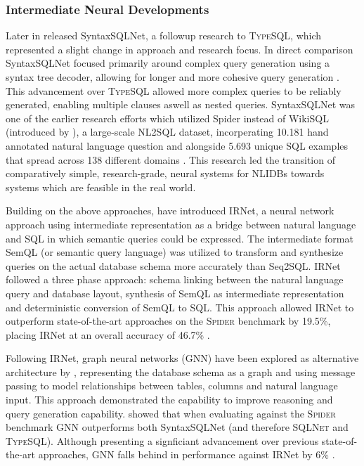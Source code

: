 \subsubsection{Intermediate Neural Developments}

Later in \citeyear{SyntaxSQLNet} \citeauthor*{SyntaxSQLNet} released SyntaxSQLNet, a followup research to \textsc{TypeSQL},
which represented a slight change in approach and research focus. In direct comparison SyntaxSQLNet focused primarily around
complex query generation using a syntax tree decoder, allowing for longer and more cohesive query generation \citep{SyntaxSQLNet}.
This advancement over \textsc{TypeSQL} allowed more complex queries to be reliably generated, enabling multiple clauses aswell as
nested queries. SyntaxSQLNet was one of the earlier research efforts which utilized Spider instead of WikiSQL (introduced by 
\cite{Seq2SQL}), a large-scale NL2SQL dataset, incorperating 10.181 hand annotated natural language question and alongside
5.693 unique SQL examples that spread across 138 different domains \citep{Spider}. This research led the transition of
comparatively simple, research-grade, neural systems for NLIDBs towards systems which are feasible in the real world.

Building on the above approaches, \citeauthor*{IRNet} have introduced IRNet, a neural network approach using intermediate
representation as a bridge between natural language and SQL in which semantic queries could be expressed. The intermediate
format SemQL (or semantic query language) was utilized to transform and synthesize queries on the actual database schema more
accurately than Seq2SQL. IRNet followed a three phase approach: schema linking between the natural language query and database
layout, synthesis of SemQL as intermediate representation and deterministic conversion of SemQL to SQL. This approach allowed
IRNet to outperform state-of-the-art approaches on the \textsc{Spider} benchmark by 19.5\%, placing IRNet at an overall accuracy
of 46.7\% \citep{IRNet}.

Following IRNet, graph neural networks (GNN) have been explored as alternative architecture by \cite{GNN}, representing the
database schema as a graph and using message passing to model relationships between tables, columns and natural language input.
This approach demonstrated the capability to improve reasoning and query generation capability. \citeauthor{GNN} showed that when 
evaluating against the \textsc{Spider} benchmark GNN outperforms both SyntaxSQLNet (and therefore \textsc{SQLNet} and
\textsc{TypeSQL}). Although presenting a signficiant advancement over previous state-of-the-art approaches, GNN falls behind in
performance against IRNet by 6\% \citep{IRNet, GNN}.

